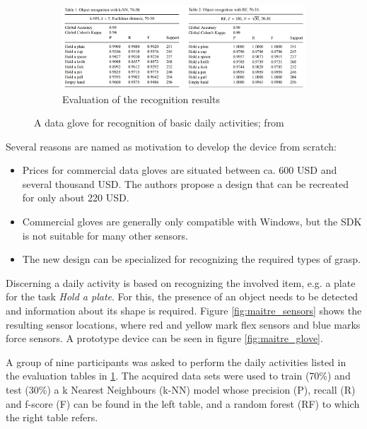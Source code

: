\documentclass[hyperref, bachelorofscience]{cgvpub}
\begin{document}
\begin{figure}[b!]
	\vspace{.5cm}
	\begin{subfigure}{\linewidth}
		\includegraphics[width=\linewidth]{../pics/maitre_results}
		\caption{Evaluation of the recognition results}
		\label{fig:maitre_results}
	\end{subfigure}
	\caption[A data glove for recognition of basic daily activities]{A data glove for recognition of basic daily activities; from \cite{maitre19}}
	\label{fig:maitre}
\end{figure}

Several reasons are named as motivation to develop the device from scratch:
\vspace{.3cm}
\begin{itemize}
	\item Prices for commercial data gloves are situated between ca. 600 USD and several thousand USD. The authors propose a design that can be recreated for only about 220 USD.
	\item Commercial gloves are generally only compatible with Windows, but the SDK is not suitable for many other sensors.
	\item The new design can be specialized for recognizing the required types of grasp.
\end{itemize}

Discerning a daily activity is based on recognizing the involved item, e.g. a plate for the task \emph{Hold a plate}. For this, the presence of an object needs to be detected and information about its shape is required. Figure \ref{fig:maitre_sensors} shows the resulting sensor locations, where red and yellow mark flex sensors and blue marks force sensors. A prototype device can be seen in figure \ref{fig:maitre_glove}. 

A group of nine participants was asked to perform the daily activities listed in the evaluation tables in \ref{fig:maitre_results}. The acquired data sets were used to train (70\%) and test (30\%) a k Nearest Neighbours (k-NN) model whose precision (P), recall (R) and f-score (F) can be found in the left table, and a random forest (RF) to which the right table refers.
\end{document}

